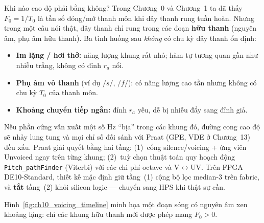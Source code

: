 \begin{firstprin}{Khi nào cao độ phải bằng không?}
Trong Chương~0 và Chương~1 ta đã thấy $F_0 = 1/T_0$ là tần số đóng/mở thanh môn khi dây thanh rung tuần hoàn. Nhưng trong một câu nói thật, dây thanh chỉ rung trong các đoạn \textbf{hữu thanh} (nguyên âm, phụ âm hữu thanh). Ba tình huống sau \emph{không} có chu kỳ dây thanh ổn định:
\begin{itemize}[leftmargin=1.4em]
    \item \textbf{Im lặng / hơi thở:} năng lượng khung rất nhỏ; hàm tự tương quan gần như nhiễu trắng, không có đỉnh $r_a$ nổi.
    \item \textbf{Phụ âm vô thanh} (ví dụ $/s/$, $/f/$): có năng lượng cao tần nhưng không có chu kỳ $T_0$ của thanh môn.
    \item \textbf{Khoảng chuyển tiếp ngắn:} đỉnh $r_a$ yếu, dễ bị nhiễu đẩy sang đỉnh giả.
\end{itemize}
Nếu phần cứng vẫn xuất một số Hz ``bịa'' trong các khung đó, đường cong cao độ sẽ nhảy lung tung và mọi chỉ số đối sánh với Praat (GPE, VDE ở Chương~13) đều xấu. Praat giải quyết bằng hai tầng: (1)~cổng silence/voicing + ứng viên Unvoiced ngay trên từng khung; (2)~tuỳ chọn thuật toán quy hoạch động \texttt{Pitch\_pathFinder} (Viterbi) với các chi phí octave và V$\leftrightarrow$UV. Trên FPGA DE10-Standard, thiết kế mặc định giữ tầng~(1) cộng bộ lọc median-3 trên fabric, và \textbf{tắt} tầng~(2) khỏi silicon logic --- chuyển sang HPS khi thật sự cần.
\end{firstprin}

Hình~\ref{fig:ch10_voicing_timeline} minh họa một đoạn sóng có nguyên âm xen khoảng lặng: chỉ các khung hữu thanh mới được phép mang $F_0>0$.

